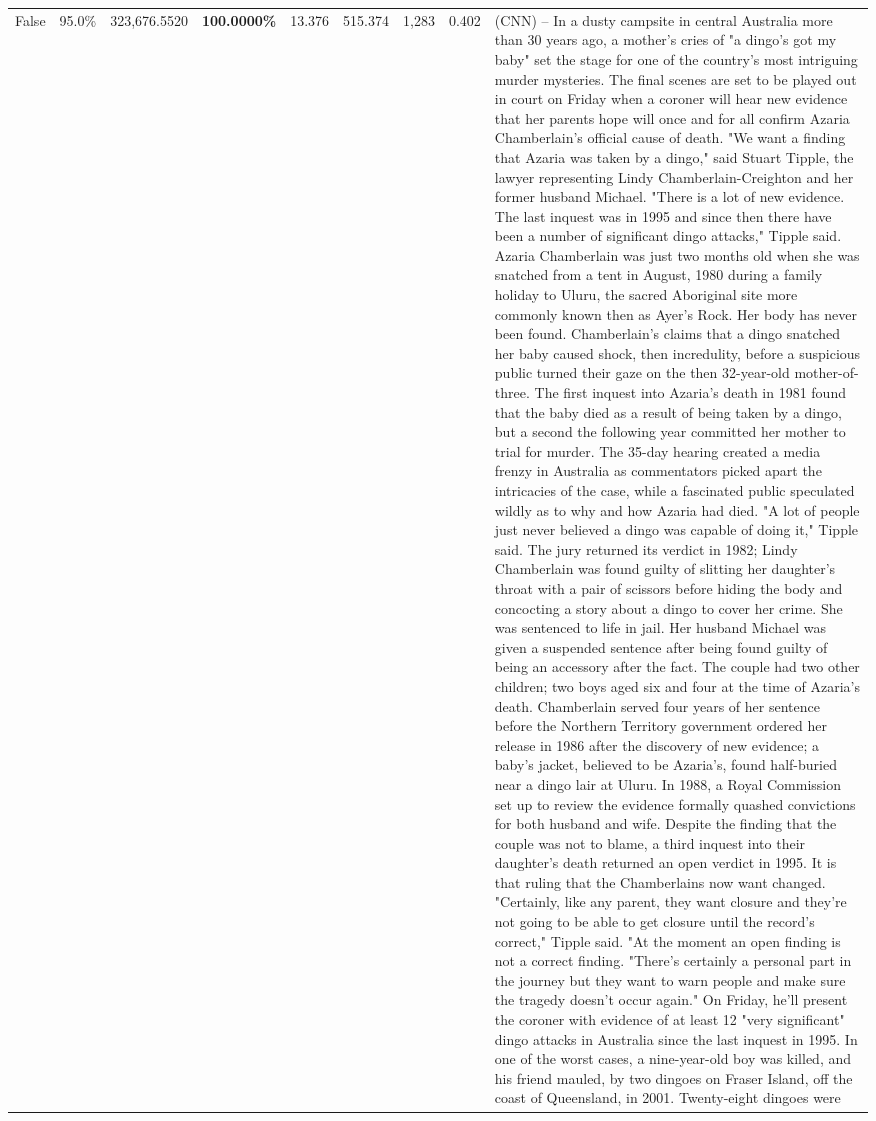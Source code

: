 \begin{table}[H]
\begin{tabular}{lllrlllll}
False & 95.0\% & 323,676.5520 & \bfseries \color{red} 100.0000\% & 13.376 & 515.374 & 1,283 & 0.402 & (CNN) -- In a dusty campsite in central Australia more than 30 years ago, a mother's cries of "a dingo's got my baby" set the stage for one of the country's most intriguing murder mysteries. The final scenes are set to be played out in court on Friday when a coroner will hear new evidence that her parents hope will once and for all confirm Azaria Chamberlain's official cause of death. "We want a finding that Azaria was taken by a dingo," said Stuart Tipple, the lawyer representing Lindy Chamberlain-Creighton and her former husband Michael. "There is a lot of new evidence. The last inquest was in 1995 and since then there have been a number of significant dingo attacks," Tipple said. Azaria Chamberlain was just two months old when she was snatched from a tent in August, 1980 during a family holiday to Uluru, the sacred Aboriginal site more commonly known then as Ayer's Rock. Her body has never been found. Chamberlain's claims that a dingo snatched her baby caused shock, then incredulity, before a suspicious public turned their gaze on the then 32-year-old mother-of-three. The first inquest into Azaria's death in 1981 found that the baby died as a result of being taken by a dingo, but a second the following year committed her mother to trial for murder. The 35-day hearing created a media frenzy in Australia as commentators picked apart the intricacies of the case, while a fascinated public speculated wildly as to why and how Azaria had died. "A lot of people just never believed a dingo was capable of doing it," Tipple said. The jury returned its verdict in 1982; Lindy Chamberlain was found guilty of slitting her daughter's throat with a pair of scissors before hiding the body and concocting a story about a dingo to cover her crime. She was sentenced to life in jail. Her husband Michael was given a suspended sentence after being found guilty of being an accessory after the fact. The couple had two other children; two boys aged six and four at the time of Azaria's death. Chamberlain served four years of her sentence before the Northern Territory government ordered her release in 1986 after the discovery of new evidence; a baby's jacket, believed to be Azaria's, found half-buried near a dingo lair at Uluru. In 1988, a Royal Commission set up to review the evidence formally quashed convictions for both husband and wife. Despite the finding that the couple was not to blame, a third inquest into their daughter's death returned an open verdict in 1995. It is that ruling that the Chamberlains now want changed. "Certainly, like any parent, they want closure and they're not going to be able to get closure until the record's correct," Tipple said. "At the moment an open finding is not a correct finding. "There's certainly a personal part in the journey but they want to warn people and make sure the tragedy doesn't occur again." On Friday, he'll present the coroner with evidence of at least 12 "very significant" dingo attacks in Australia since the last inquest in 1995. In one of the worst cases, a nine-year-old boy was killed, and his friend mauled, by two dingoes on Fraser Island, off the coast of Queensland, in 2001. Twenty-eight dingoes were 
\end{tabular}
\end{table}
